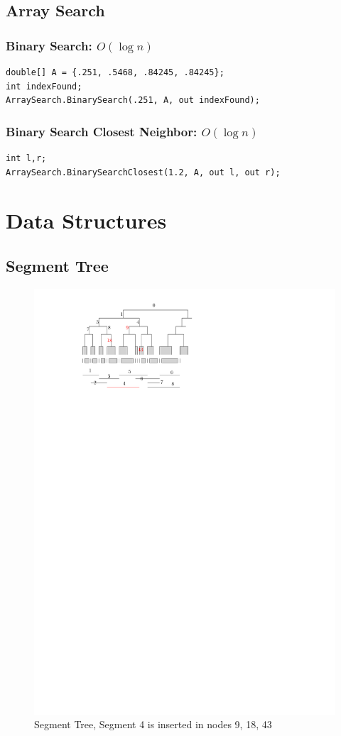 \documentclass{article}
\begin{document}
\subsection{Array Search}

\subsubsection{Binary Search: $O(\log n)$}            \begin{lstlisting}
double[] A = {.251, .5468, .84245, .84245};            
int indexFound;
ArraySearch.BinarySearch(.251, A, out indexFound); 
\end{lstlisting}
\subsubsection{Binary Search Closest Neighbor: $O(\log n)$}           
\begin{lstlisting}
int l,r;
ArraySearch.BinarySearchClosest(1.2, A, out l, out r);
\end{lstlisting}



\newpage
\section{Data Structures}
\subsection{Segment Tree}
\begin{figure}[h]
\centering
\includegraphics[width=.5\textwidth]{Figures/segmenttree.pdf}
\caption{Segment Tree, Segment 4 is inserted in nodes 9, 18, 43}
\label{fig:NearestNeighborinaCone}
\end{figure}
\end{document}
